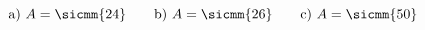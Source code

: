 \begin{exercise}
\begin{center}
    \end{center}
  \fi
  \ifoutcome\outcome\par
    \begin{equation*}
      \text{a)~}A=\sicmm{24}
      \qquad
      \text{b)~}A=\sicmm{26}
      \qquad
      \text{c)~}A=\sicmm{50}
    \end{equation*}
  \fi
\end{exercise}
